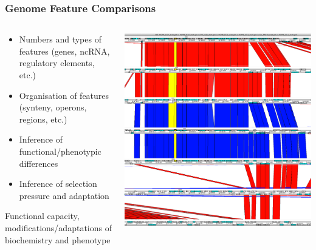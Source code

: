 \begin{frame}
  \frametitle{Genome Feature Comparisons}
  \begin{columns}
    \begin{column}{5cm}
      \begin{itemize}
        \item Numbers and types of features (genes, ncRNA, regulatory elements, etc.)
        \item Organisation of features (synteny, operons, regions, etc.)
        \item Inference of functional/phenotypic differences
        \item Inference of selection pressure and adaptation
      \end{itemize}  
      Functional capacity, modifications/adaptations of biochemistry and phenotype  
    \end{column}
    \begin{column}{5cm}
      \includegraphics[width=1\textwidth]{images/t6ss}    
    \end{column}
  \end{columns}
\end{frame}